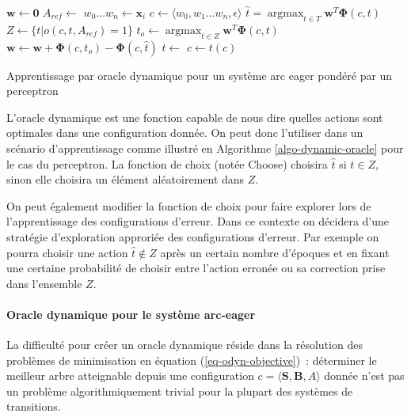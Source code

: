 \documentclass[11pt,openany]{book}
\begin{document}
\begin{algorithm}[htbp]
\scriptsize
\begin{algorithmic}[0]
\State $\mathbf{w} \gets \mathbf{0}$
\State $A_{ref} \gets$ 
\State $w_0\ldots w_n \gets \mathbf{x}_i$
\State $c \gets \langle w_0 , w_1\ldots w_n, \epsilon \rangle $
\State $\hat{t} = \mathop{\text{argmax}}_{t\in T} \mathbf{w}^T \boldsymbol\Phi(c,t)$
\State $Z \gets \{t | o(c,t,A_{ref}) = 1\}$
\State $t_o \gets \mathop{\text{argmax}}_{t\in Z} \mathbf{w}^T \boldsymbol\Phi(c,t)$
\State $\mathbf{w} \gets  \mathbf{w} + \boldsymbol\Phi(c,t_o) - \boldsymbol\Phi(c,\hat{t}) $
\EndIf
\State $t \gets  $
\State $c\gets t(c)$
\EndWhile
\EndFor
\EndFor
\EndFunction
\end{algorithmic}
\caption{\label{algo-dynamic-oracle}Apprentissage par oracle dynamique pour un système arc eager pondéré par un perceptron}
\end{algorithm}
L'oracle dynamique est une fonction capable de nous dire quelles
actions sont optimales dans une configuration donnée. On peut donc
l'utiliser dans un scénario d'apprentissage comme illustré en
Algorithme \ref{algo-dynamic-oracle} pour le cas du perceptron.
La fonction de choix (notée {\sc Choose})  choisira $\hat{t}$ si $t\in
Z$, sinon elle choisira un élément aléatoirement dans $Z$.

On peut également modifier la fonction de choix pour faire explorer
lors de l'apprentissage des configurations d'erreur. Dans ce contexte
on décidera d'une stratégie d'exploration approriée des configurations
d'erreur. Par exemple on pourra choisir une action $\hat{t} \not\in Z$
 après un certain nombre d'époques et en fixant une certaine
 probabilité de choisir entre l'action erronée ou sa correction prise
 dans l'ensemble $Z$.

\paragraph{Oracle dynamique pour le système arc-eager}
La difficulté pour créer un oracle dynamique réside dans la résolution
des problèmes de minimisation en équation (\ref{eq-odyn-objective})~:
déterminer le meilleur arbre atteignable depuis une configuration $c =
\langle \mathbf{S},\mathbf{B},A\rangle$ donnée n'est pas un problème
algorithmiquement trivial pour la plupart
des systèmes de transitions.
\end{document}
